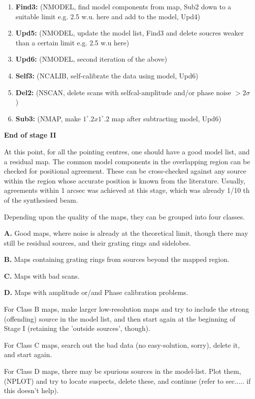 \begin{enumerate}
\item {\bf Find3:} (NMODEL, find model components from map, Sub2 down to a
suitable limit e.g. 2.5 w.u. here and add to the model, Upd4)
\item {\bf Upd5:} (NMODEL, update the model list, Find3 and delete soucres
weaker than a certain limit e.g. 2.5 w.u here)
\item {\bf Upd6:} (NMODEL, second iteration of the above)
\item {\bf Self3:} (NCALIB, self-calibrate the data using model, Upd6)
\item {\bf Del2:} (NSCAN, delete scans with selfcal-amplitude and/or phase
noise $ > 2 \sigma$)
\item {\bf Sub3:} (NMAP, make $ 1^\circ .2 x 1^\circ .2 $ map after subtracting
model, Upd6)
\end{enumerate}

{\bf End of stage II}

At this point, for all the pointing centres, one should have a good model list,
and a residual map. The common model components in the overlapping region can
be checked for positional agreement. These can be cross-checked against any
source within the region whose accurate position is known from the literature.
Usually, agreements within 1 arcsec was achieved at this stage, which was
already 1/10 th of the synthesised beam.

Depending upon the quality of the maps, they can be grouped into four classes.

{\bf A.} Good maps, where noise is already at the theoretical limit, though
there may still be residual sources, and their grating rings and sidelobes.

{\bf B.} Maps containing grating rings from sources beyond the mapped region.

{\bf C.} Maps with bad scans.

{\bf D.} Maps with amplitude or/and Phase calibration problems.

For Class B maps, make larger low-resolution maps and try to include the strong
(offending) source in the model list, and then start again at the beginning of
Stage I (retaining the 'outside sources', though).

For Class C maps, search out the bad data (no easy-solution, sorry), delete it,
and start again.

For Class D maps, there may be spurious sources in the model-list. Plot them,
(NPLOT) and try to locate suspects, delete these, and continue (refer to
sec..... if this doesn't help).

